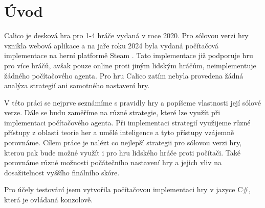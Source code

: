 \chapter*{Úvod}

Calico je desková hra pro 1-4 hráče vydaná v roce 2020. Pro sólovou verzi hry vznikla webová aplikace \citep{calicoGame} a na jaře roku 2024 byla vydaná počítačová implementace na herní platformě Steam \citep{quiltsAndCatsOfCalico}. Tato implementace již podporuje hru pro více hráčů, avšak pouze online proti jiným lidským hráčům, neimplementuje žádného počítačového agenta. Pro hru Calico zatím nebyla provedena žádná analýza strategií ani samotného nastavení hry.

V této práci se nejprve seznámíme s pravidly hry a popíšeme vlastnosti její sólové verze. Dále se budu zaměříme na různé strategie, které lze využít při implementaci počítačového agenta. Při implementaci strategií využijeme různé přístupy z oblasti teorie her a umělé inteligence a tyto přístupy vzájemně porovnáme. Cílem práce je nalézt co nejlepší strategii pro sólovou verzi hry, kterou pak bude možné využít i pro hru lidského hráče proti počítači. Také porovnáme různé možnosti počátečního nastavení hry a jejich vliv na dosažitelnost vyššího finálního skóre.

Pro účely testování jsem vytvořila počítačovou implementaci hry v jazyce C\#, která je ovládaná konzolově.




